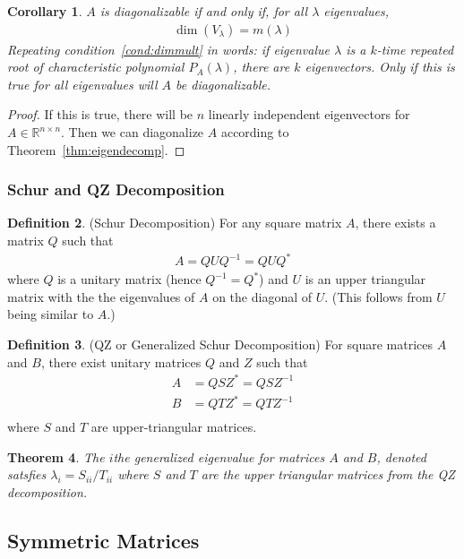 \documentclass[12pt]{article}
\numberwithin{equation}{section} %
\theoremstyle{plain}
\newtheorem{thm}{Theorem}[section]
\newtheorem{cor}[thm]{Corollary}
\theoremstyle{definition}
\newtheorem{defn}[thm]{Definition}
\theoremstyle{remark}
\newcommand{\Rnn}{\mathbb{R}^{n\times n}}
\begin{document}
\begin{cor}
$A$ is diagonalizable if and only if, for all $\lambda$ eigenvalues,
\begin{align}
  \label{cond:dimmult}
  \dim(V_\lambda)=m(\lambda)
\end{align}
Repeating condition~\ref{cond:dimmult} in words: if eigenvalue $\lambda$
is a $k$-time repeated root of characteristic polynomial $P_A(\lambda)$,
there are $k$ eigenvectors. Only if this is true for all eigenvalues
will $A$ be diagonalizable.
\end{cor}
\begin{proof}
If this is true, there will be $n$ linearly independent eigenvectors for
$A\in \Rnn$. Then we can diagonalize $A$ according to
Theorem~\ref{thm:eigendecomp}.
\end{proof}


\subsubsection{Schur and QZ Decomposition}

\begin{defn}{(Schur Decomposition)}
For any square matrix $A$, there exists a matrix $Q$ such that
\begin{align*}
  A = Q U Q^{-1} = Q U Q^*
\end{align*}
where $Q$ is a unitary matrix (hence $Q^{-1} = Q^*$) and $U$ is an upper
triangular matrix with the the eigenvalues of $A$ on the diagonal of
$U$. (This follows from $U$ being similar to $A$.)
\end{defn}

\begin{defn}{(QZ or Generalized Schur Decomposition)}
For square matrices $A$ and $B$, there exist unitary matrices $Q$ and
$Z$ such that
\begin{align*}
  A &= Q S Z^* = QSZ^{-1} \\
  B &= Q T Z^* = QTZ^{-1} \\
\end{align*}
where $S$ and $T$ are upper-triangular matrices.
\end{defn}

\begin{thm}
The $i$the generalized eigenvalue for matrices $A$ and $B$, denoted
satsfies $\lambda_i = S_{ii} / T_{ii}$ where $S$ and $T$ are the upper
triangular matrices from the QZ decomposition.
\end{thm}


\clearpage
\subsection{Symmetric Matrices}
\end{document}
